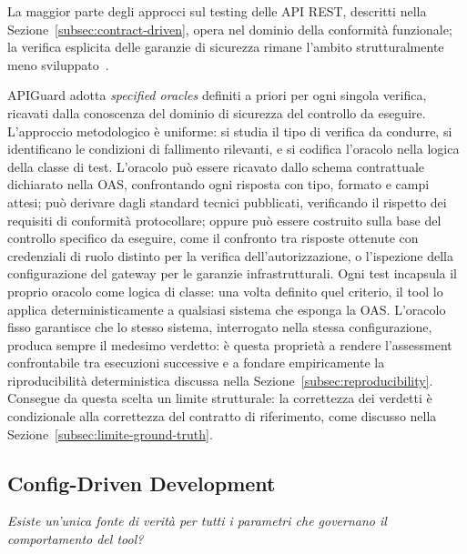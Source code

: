 La maggior parte degli approcci sul testing delle \gls{API} REST, descritti nella Sezione~\ref{subsec:contract-driven}, opera nel dominio della conformità funzionale; la verifica esplicita delle garanzie di sicurezza rimane l'ambito strutturalmente meno sviluppato~\cite{golmohammadiTestingRESTfulAPIs2023}.

APIGuard adotta \emph{specified oracles} definiti a priori per ogni singola verifica, ricavati dalla conoscenza del dominio di sicurezza del controllo da eseguire. L'approccio metodologico è uniforme: si studia il tipo di verifica da condurre, si identificano le condizioni di fallimento rilevanti, e si codifica l'oracolo nella logica della classe di test. L'oracolo può essere ricavato dallo schema contrattuale dichiarato nella \gls{OAS}, confrontando ogni risposta con tipo, formato e campi attesi; può derivare dagli standard tecnici pubblicati, verificando il rispetto dei requisiti di conformità protocollare; oppure può essere costruito sulla base del controllo specifico da eseguire, come il confronto tra risposte ottenute con credenziali di ruolo distinto per la verifica dell'autorizzazione, o l'ispezione della configurazione del gateway per le garanzie infrastrutturali.
Ogni test incapsula il proprio oracolo come logica di classe: una volta definito quel criterio, il tool lo applica deterministicamente a qualsiasi sistema che esponga la \gls{OAS}.
L'oracolo fisso garantisce che lo stesso sistema, interrogato nella stessa configurazione, produca sempre il medesimo verdetto: è questa proprietà a rendere l'assessment confrontabile tra esecuzioni successive e a fondare empiricamente la riproducibilità deterministica discussa nella Sezione~\ref{subsec:reproducibility}.
Consegue da questa scelta un limite strutturale: la correttezza dei verdetti è condizionale alla correttezza del contratto di riferimento, come discusso nella Sezione~\ref{subsec:limite-ground-truth}.


\subsection{Config-Driven Development}\label{subsec:config-driven}

\textit{Esiste un'unica fonte di verità per tutti i parametri che governano il comportamento del tool?}

